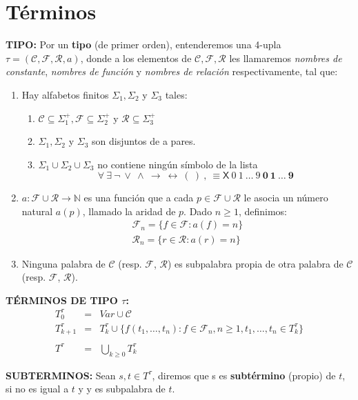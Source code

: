 \section{Términos}
	\PN \textbf{TIPO:} Por un \textbf{tipo} (de primer orden), entenderemos una 4-upla $\tau = (\mathcal{C}, \mathcal{F},
	\mathcal{R}, a)$, donde a los elementos de $\mathcal{C}, \mathcal{F}, \mathcal{R}$ les llamaremos \textit{nombres de
	constante}, \textit{nombres de función} y \textit{nombres de relación} respectivamente, tal que:
	\begin{enumerate}[(1)]
		\item Hay alfabetos finitos $\Sigma_{1}, \Sigma_{2}$ y $\Sigma_{3}$ tales:
			\begin{enumerate}
				\item $\mathcal{C} \subseteq \Sigma_{1}^{+}, \mathcal{F} \subseteq \Sigma_{2}^{+}$ y $\mathcal{R} \subseteq
					\Sigma_{3}^{+}$
				\item $\Sigma_{1}, \Sigma_{2}$ y $\Sigma_{3}$ son disjuntos de a pares.
				\item $\Sigma_{1} \cup \Sigma_{2} \cup \Sigma_{3}$ no contiene ningún símbolo de la lista
					\[
						\forall \ \exists \ \lnot \ \vee \ \wedge \ \rightarrow \ \leftrightarrow \ (\ )\ , \ \equiv \mathsf{X} \
						\mathit{0} \ \mathit{1} \ \dotsc \ \mathit{9} \ \mathbf{0} \ \mathbf{1} \ \dotsc \ \mathbf{9}
					\]
			\end{enumerate}

		\item $a: \mathcal{F} \cup \mathcal{R} \rightarrow \mathbb{N}$ es una función que a cada $p \in \mathcal{F} \cup
		\mathcal{R}$ le asocia un número natural $a(p)$, llamado la aridad de $p$. Dado $n \geq 1$, definimos:
			\begin{eqnarray*}
				\mathcal{F}_{n} = \{f \in \mathcal{F}: a(f) = n\} \\
				\mathcal{R}_{n} = \{r \in \mathcal{R}: a(r) = n\}
			\end{eqnarray*}

		\item Ninguna palabra de $\mathcal{C}$ (resp. $\mathcal{F}$, $\mathcal{R }$) es subpalabra propia de otra palabra de
		$\mathcal{C}$ (resp. $\mathcal{F} $, $\mathcal{R}$).
	\end{enumerate}

	\vspace{3mm}
	\PN \textbf{TÉRMINOS DE TIPO $\tau$:}
	\begin{eqnarray*}
		T_{0}^{\tau} &=& Var \cup \mathcal{C} \\
		T_{k+1}^{\tau} &=& T_{k}^{\tau} \cup \{f(t_{1}, \dotsc, t_{n}): f \in \mathcal{F}_{n},n\geq 1,t_{1}, \dotsc, t_{n}
			\in T_{k}^{\tau }\} \\
		\\
		T^{\tau} &=& \bigcup_{k \geq  0} T_{k}^{\tau}
	\end{eqnarray*}

	\vspace{3mm}
	\PN \textbf{SUBTERMINOS:}
	\PN Sean $s, t \in T^{\tau}$, diremos que s es \textbf{subtérmino} (propio) de $t$, si no es igual a $t$ y y es
	subpalabra de $t$.
